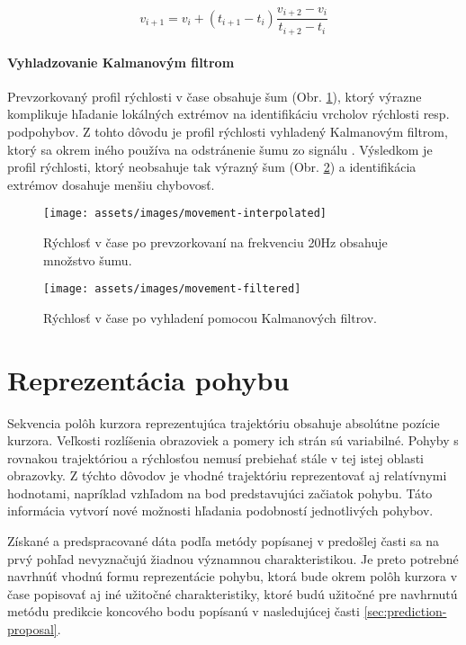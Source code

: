 \begin{equation}
v_{i+1} = v_{i} + (t_{i+1} - t_{i}) \frac{v_{i+2} - v_{i}}{t_{i+2} - t_{i}}
\label{eq:linear-interpolation}
\end{equation}

\paragraph*{Vyhladzovanie Kalmanovým filtrom} Prevzorkovaný profil rýchlosti v čase obsahuje šum (Obr. \ref{fig:movement-interpolated}), ktorý výrazne komplikuje hľadanie lokálných extrémov na identifikáciu vrcholov rýchlosti resp. podpohybov. Z tohto dôvodu je profil rýchlosti vyhladený Kalmanovým filtrom, ktorý sa okrem iného používa na odstránenie šumu zo signálu \cite{ahmad2014probabilistic}. Výsledkom je profil rýchlosti, ktorý neobsahuje tak výrazný šum  (Obr. \ref{fig:movement-filtered}) a identifikácia extrémov dosahuje menšiu chybovosť.

\begin{figure}[h]
\centering
\texttt{[image: assets/images/movement-interpolated]}
\par
\caption{Rýchlosť v čase po prevzorkovaní na frekvenciu 20Hz obsahuje množstvo šumu.\label{fig:movement-interpolated}}
\end{figure}
\begin{figure}[h]
\centering
\texttt{[image: assets/images/movement-filtered]}
\caption{Rýchlosť v čase po vyhladení pomocou Kalmanových filtrov. \label{fig:movement-filtered}}
\end{figure}

\section{Reprezentácia pohybu}\label{sec:representation}

Sekvencia polôh kurzora reprezentujúca trajektóriu obsahuje absolútne pozície kurzora. Veľkosti rozlíšenia obrazoviek a pomery ich strán sú variabilné. Pohyby s rovnakou trajektóriou a rýchlosťou nemusí prebiehať stále v tej istej oblasti obrazovky. Z týchto dôvodov je vhodné trajektóriu reprezentovať aj relatívnymi hodnotami, napríklad vzhľadom na bod predstavujúci začiatok pohybu. Táto informácia vytvorí nové možnosti hľadania podobností jednotlivých pohybov.

Získané a predspracované dáta podľa metódy popísanej v predošlej časti sa na prvý pohľad nevyznačujú žiadnou významnou charakteristikou. Je preto potrebné navrhnúť vhodnú formu reprezentácie pohybu, ktorá bude okrem polôh kurzora v čase popisovať aj iné užitočné charakteristiky, ktoré budú užitočné pre navhrnutú metódu predikcie koncového bodu popísanú v nasledujúcej časti \ref{sec:prediction-proposal}. 

